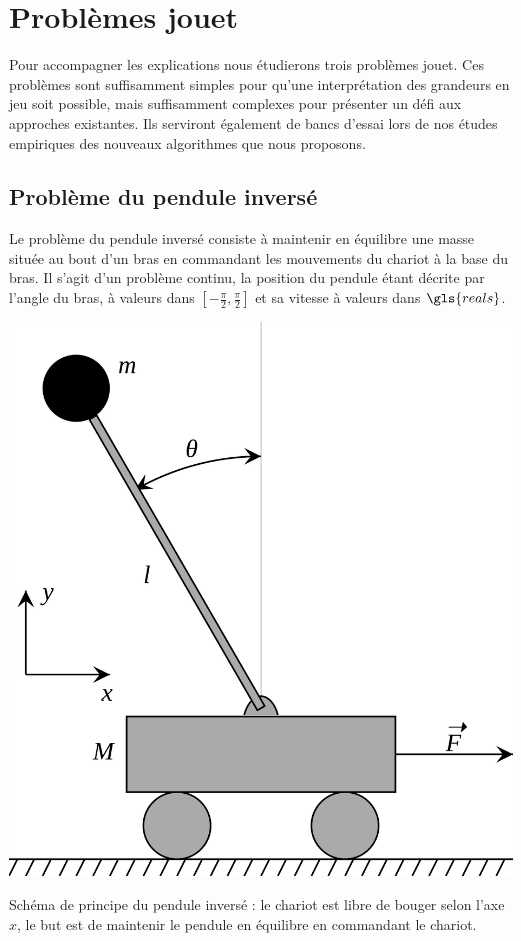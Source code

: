 \documentclass[frenchb,a4paper,justified,notoc]{tufte-book}
\newcommand{\reals}{\gls{reals}}
\begin{document}
\chapter{Problèmes jouet}
\label{sec-9}
\label{hier-jouets}

   Pour accompagner les explications nous étudierons trois problèmes jouet. Ces problèmes sont suffisamment simples pour qu'une interprétation des grandeurs en jeu soit possible, mais suffisamment complexes pour présenter un défi aux approches existantes. Ils serviront également de bancs d'essai lors de nos études empiriques des nouveaux algorithmes que nous proposons.
\section{Problème du pendule inversé}
\label{sec-9-1}
\label{hier-pendule}


Le problème du pendule inversé consiste à maintenir en équilibre une masse située au bout d'un bras en commandant les mouvements du chariot à la base du bras. Il s'agit d'un problème continu, la position du pendule étant décrite par l'angle du bras, à valeurs dans $[-\frac{\pi}{2},\frac{\pi}{2}]$ et sa vitesse à valeurs dans $\reals$. 

\begin{marginfigure}
\centering
\includegraphics[width=\textwidth]{Figures/Pendule.png}
\caption[Pendule inversé]{Schéma de principe du pendule inversé : le chariot est libre de bouger selon l'axe $x$, le but est de maintenir le pendule en équilibre en commandant le chariot.}
\end{marginfigure}
\end{document}
